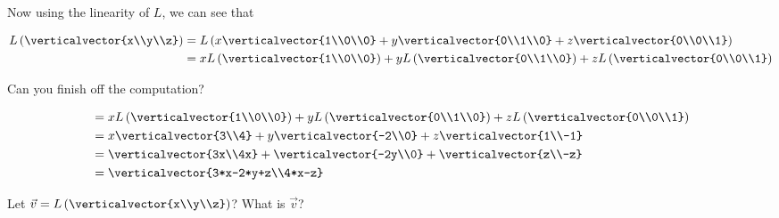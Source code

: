 \documentclass{ximera}
\begin{document}
\begin{question}
\begin{solution}
\begin{hint}
  		Now using the linearity of $L$, we can see that 
  		
  		\begin{align*}
  			L\left(\verticalvector{x\\y\\z}\right) &= L\left( x\verticalvector{1\\0\\0}+y\verticalvector{0\\1\\0}+z\verticalvector{0\\0\\1} \right)\\
  			&= xL\left(\verticalvector{1\\0\\0}\right)+yL\left(\verticalvector{0\\1\\0}\right)+zL\left(\verticalvector{0\\0\\1}\right)
  		\end{align*}
  		
  		Can you finish off the computation?
  	\end{hint}
  	\begin{hint}
  		\begin{align*}
  			&= xL\left(\verticalvector{1\\0\\0}\right)+yL\left(\verticalvector{0\\1\\0}\right)+zL\left(\verticalvector{0\\0\\1}\right)\\
  			&= x\verticalvector{3\\4}+y\verticalvector{-2\\0}+z\verticalvector{1\\-1}\\
  			&= \verticalvector{3x\\4x}+\verticalvector{-2y\\0}+\verticalvector{z\\-z}\\
  			&= \verticalvector{3*x-2*y+z\\4*x-z}
  		\end{align*}
  	\end{hint}
    Let $\vec{v} = L\left(\verticalvector{x\\y\\z}\right)$?  What is $\vec{v}$?


\end{solution}
\end{question}
\end{document}
